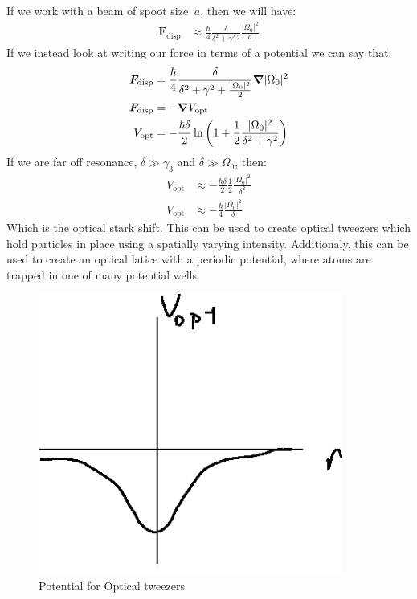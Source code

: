 If we work with a beam of spoot size $~a$, then we will have:
\begin{align*}
	\bm{F}_\text{disp} &\approx \frac{\hbar}{4} \frac{\delta}{\delta^2 + \gamma'\ ^2}\frac{|\Omega_0|^2}{a}
\end{align*}
If we instead look at writing our force in terms of a potential we can say that:
\begin{align*}
	\bm{F}_\text{disp} &= \frac{\hbar}{4} \frac{\delta}{\delta^2 + \gamma^2 + \frac{|\Omega_0|^2}{2}}\bm{\nabla} |\Omega_0|^2 \\
	\bm{F}_\text{disp} &= - \bm{\nabla} V_\text{opt} \\
	V_\text{opt} &= -\frac{\hbar\delta}{2}\ln \left(1 + \frac{1}{2}\frac{|\Omega_0|^2}{\delta^2 + \gamma^2}\right)
\end{align*}
If we are far off resonance, $\delta \gg \gamma_3$ and $\delta \gg \Omega_0$, then:
\begin{align*}
	V_\text{opt} &\approx -\frac{\hbar\delta}{2}\frac{1}{2}\frac{|\Omega_0|^2}{\delta^2} \\
	V_\text{opt} &\approx -\frac{\hbar}{4}\frac{|\Omega_0|^2}{\delta}
\end{align*}
Which is the optical stark shift. This can be used to create optical tweezers which hold particles in place using a spatially varying intensity.
Additionaly, this can be used to create an optical latice with a periodic potential, where atoms are trapped in one of many potential wells.
\begin{figure}[h!]
	\centering
	\includegraphics[width=10cm]{images/12-03-1.png}
	\caption*{Potential for Optical tweezers}
\end{figure}
